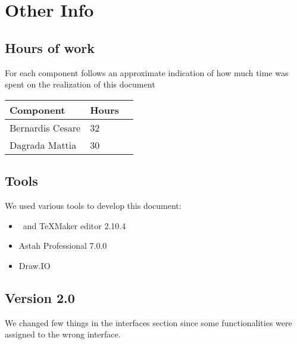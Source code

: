 \section{Other Info}
\subsection{Hours of work}
	For each component follows an approximate indication of how much time was
	spent on the realization of this document
	\begin{center}
		\begin{tabular}{ | l | l | p{5cm} |}
			\hline
			Component & Hours 					\\ \hline
			Bernardis Cesare & 32 				\\ \hline
			Dagrada Mattia & 30  				\\ \hline
			\end{tabular}
			\end{center}
			
\subsection{Tools}
	We used various tools to develop this document:
	\begin{itemize}
		\item \LaTeXe \, and TeXMaker editor 2.10.4
		\item Astah Professional 7.0.0
		\item Draw.IO
	\end{itemize}

\subsection{Version 2.0}
We changed few things in the interfaces section since some functionalities were 
assigned to the wrong interface.  